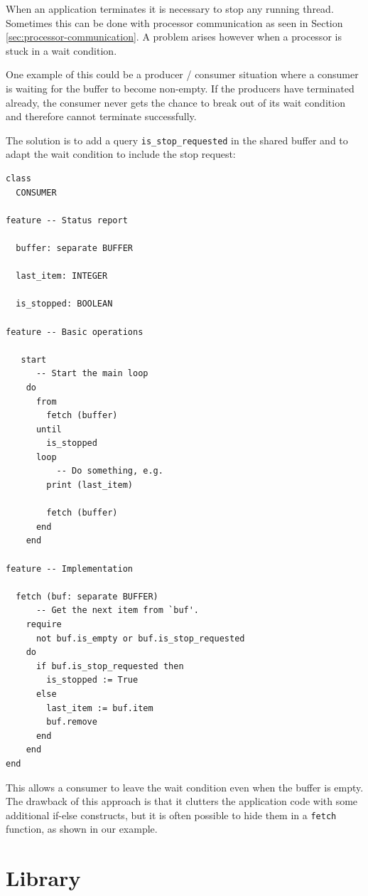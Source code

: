 \documentclass[a4paper,10pt]{article}
\begin{document}
When an application terminates it is necessary to stop any running thread.
Sometimes this can be done with processor communication as seen in Section \ref{sec:processor-communication}.
A problem arises however when a processor is stuck in a wait condition.

One example of this could be a producer / consumer situation where a consumer is waiting for the buffer to become non-empty.
If the producers have terminated already, the consumer never gets the chance to break out of its wait condition and therefore cannot terminate successfully.

The solution is to add a query \lstinline!is_stop_requested! in the shared buffer and to adapt the wait condition to include the stop request:

\begin{lstlisting}[language=OOSC2Eiffel, captionpos=b, caption={Breaking out of a wait condition.}]
class
  CONSUMER

feature -- Status report

  buffer: separate BUFFER
  
  last_item: INTEGER
  
  is_stopped: BOOLEAN
  
feature -- Basic operations
  
   start
      -- Start the main loop
    do
      from
        fetch (buffer)
      until 
        is_stopped
      loop
          -- Do something, e.g.
        print (last_item)

        fetch (buffer)
      end
    end
  
feature -- Implementation

  fetch (buf: separate BUFFER)
      -- Get the next item from `buf'.
    require
      not buf.is_empty or buf.is_stop_requested
    do
      if buf.is_stop_requested then
        is_stopped := True
      else
        last_item := buf.item
        buf.remove
      end
    end
end
\end{lstlisting}

This allows a consumer to leave the wait condition even when the buffer is empty.
The drawback of this approach is that it clutters the application code with some additional if-else constructs, 
but it is often possible to hide them in a \lstinline!fetch! function, as shown in our example.

\section {Library}
\label{sec:library}
\end{document}
